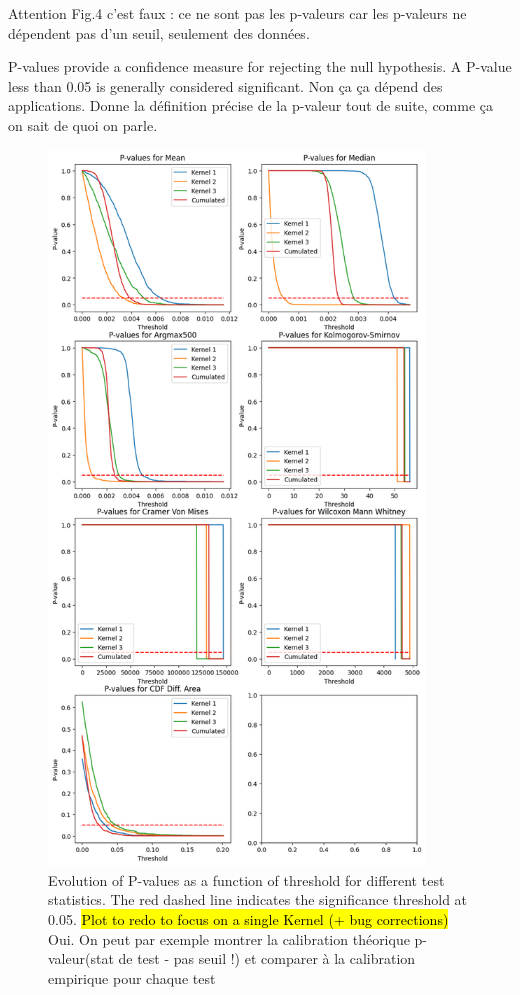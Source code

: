 \documentclass{article}
\newcommand{\dm}[1]{{\color{mulberry} #1}}
\begin{document}
\dm{Attention Fig.4 c'est faux : ce ne sont pas les p-valeurs car les p-valeurs ne dépendent pas d'un seuil, seulement des données.}

P-values provide a confidence measure for rejecting the null hypothesis. A P-value less than 0.05 is generally considered significant. \dm{Non ça ça dépend des applications. Donne la définition précise de la p-valeur tout de suite, comme ça on sait de quoi on parle. }\\


\begin{figure}[H]
\centering
\includegraphics[width=10cm]{img/p-values.png}
\caption{Evolution of P-values as a function of threshold for different test statistics. The red dashed line indicates the significance threshold at 0.05. \hl{Plot to redo to focus on a single Kernel (+ bug corrections)} \dm{Oui. On peut par exemple montrer la calibration théorique p-valeur(stat de test - pas seuil !) et comparer à la calibration empirique pour chaque test }}


\label{fig:pvalues}
\end{figure}
\end{document}
